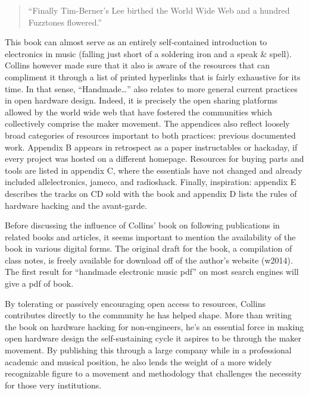 \begin{itemize}
\begin{quote}

“Finally Tim-Berner’s Lee birthed the World Wide Web and a hundred Fuzztones flowered.” 
	
\cite[p211]{collins2006}

\end{quote}

This book can almost serve as an entirely self-contained introduction to electronics in music (falling just short of a soldering iron and a speak \& spell). Collins however made sure that it also is aware of the resources that can compliment it through a list of printed hyperlinks that is fairly exhaustive for its time. In that sense, “Handmade…” also relates to more general current practices in open hardware design. Indeed, it is precisely the open sharing platforms allowed by the world wide web that have fostered the communities which collectively comprise the maker movement. The appendices also reflect loosely broad categories of resources important to both practices: previous documented work. Appendix B appears in retrospect as a paper instructables or hackaday, if every project was hosted on a different homepage. Resources for buying parts and tools are listed in appendix C, where the essentials have not changed and already included allelectronics, jameco, and radioshack. Finally, inspiration: appendix E describes the tracks on CD sold with the book and appendix D lists the rules of hardware hacking and the avant-garde. 
	
	Before discussing the influence of Collins’ book on following publications in related books and articles, it seems important to mention the availability of the book in various digital forms. The original draft for the book, a compilation of class notes, is freely available for download off of the author’s website (w2014). The first result for “handmade electronic music pdf” on most search engines will give a pdf of book.

	By tolerating or passively encouraging open access to resources, Collins contributes directly to the community he has helped shape. More than writing the book on hardware hacking for non-engineers, he’s an essential force in making open hardware design the self-sustaining cycle it aspires to be through the maker movement. By publishing this through a large company while in a professional academic and musical position, he also lends the weight of a more widely recognizable figure to a movement and methodology that challenges the necessity for those very institutions.


\end{itemize}
